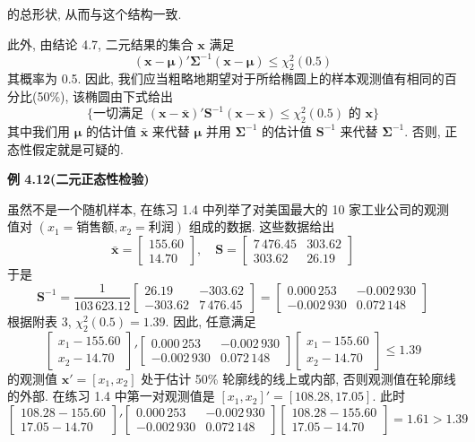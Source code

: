 的总形状, 从而与这个结构一致.

此外, 由结论 4.7, 二元结果的集合 $\mathbf{x}$ 满足
\[
(\mathbf{x}-\boldsymbol{\mu})'\boldsymbol{\Sigma}^{-1}(\mathbf{x}-\boldsymbol{\mu})\le \chi_{2}^{2}(0.5)
\]
其概率为 0.5. 因此, 我们应当粗略地期望对于所给椭圆上的样本观测值有相同的百分比(50\%), 该椭圆由下式给出
\[
\{\text{一切满足 } (\mathbf{x}-\bar{\mathbf{x}})'\mathbf{S}^{-1}(\mathbf{x}-\bar{\mathbf{x}})\le \chi_{2}^{2}(0.5) \text{ 的 } \mathbf{x}\}
\]
其中我们用 $\boldsymbol{\mu}$ 的估计值 $\bar{\mathbf{x}}$ 来代替 $\boldsymbol{\mu}$ 并用 $\boldsymbol{\Sigma}^{-1}$ 的估计值 $\mathbf{S}^{-1}$ 来代替 $\boldsymbol{\Sigma}^{-1}$. 否则, 正态性假定就是可疑的.

\noindent\textbf{例 4.12}\quad \textbf{(二元正态性检验)}

虽然不是一个随机样本, 在练习 1.4 中列举了对美国最大的 10 家工业公司的观测值对 $(x_{1}=\text{销售额},x_{2}=\text{利润})$ 组成的数据. 这些数据给出
\[
\bar{\mathbf{x}}=\begin{bmatrix}155.60\\14.70\end{bmatrix},\quad \mathbf{S}=\begin{bmatrix}7\,476.45 & 303.62\\303.62 & 26.19\end{bmatrix}
\]
于是
\[
\mathbf{S}^{-1}=\frac{1}{103\,623.12}\begin{bmatrix}26.19 & -303.62\\-303.62 & 7\,476.45\end{bmatrix}
=\begin{bmatrix}0.000\,253 & -0.002\,930\\-0.002\,930 & 0.072\,148\end{bmatrix}
\]
根据附表 3, $\chi_{2}^{2}(0.5)=1.39$. 因此, 任意满足
\[
\begin{bmatrix}x_{1}-155.60\\x_{2}-14.70\end{bmatrix}'\begin{bmatrix}0.000\,253 & -0.002\,930\\-0.002\,930 & 0.072\,148\end{bmatrix}\begin{bmatrix}x_{1}-155.60\\x_{2}-14.70\end{bmatrix}\le 1.39
\]
的观测值 $\mathbf{x}'=[x_{1},x_{2}]$ 处于估计 50\% 轮廓线的线上或内部, 否则观测值在轮廓线的外部. 在练习 1.4 中第一对观测值是 $[x_{1},x_{2}]'=[108.28,17.05]$. 此时
\[
\begin{bmatrix}108.28-155.60\\17.05-14.70\end{bmatrix}'\begin{bmatrix}0.000\,253 & -0.002\,930\\-0.002\,930 & 0.072\,148\end{bmatrix}\begin{bmatrix}108.28-155.60\\17.05-14.70\end{bmatrix}=1.61>1.39
\]
